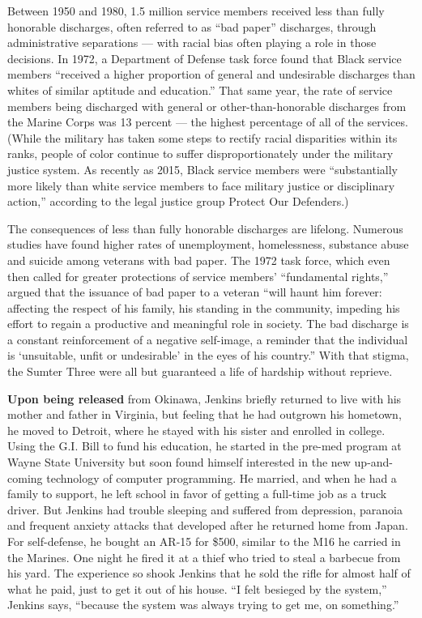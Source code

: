 Between 1950 and 1980, 1.5 million service members received less than
fully honorable discharges, often referred to as ``bad paper''
discharges, through administrative separations --- with racial bias
often playing a role in those decisions. In 1972, a Department of
Defense task force found that Black service members ``received a higher
proportion of general and undesirable discharges than whites of similar
aptitude and education.'' That same year, the rate of service members
being discharged with general or other-than-honorable discharges from
the Marine Corps was 13 percent --- the highest percentage of all of the
services. (While the military has taken some steps to rectify racial
disparities within its ranks, people of color continue to suffer
disproportionately under the military justice system. As recently as
2015, Black service members were ``substantially more likely than white
service members to face military justice or disciplinary action,''
according to the legal justice group Protect Our Defenders.)

The consequences of less than fully honorable discharges are lifelong.
Numerous studies have found higher rates of unemployment, homelessness,
substance abuse and suicide among veterans with bad paper. The 1972 task
force, which even then called for greater protections of service
members' ``fundamental rights,'' argued that the issuance of bad paper
to a veteran ``will haunt him forever: affecting the respect of his
family, his standing in the community, impeding his effort to regain a
productive and meaningful role in society. The bad discharge is a
constant reinforcement of a negative self-image, a reminder that the
individual is `unsuitable, unfit or undesirable' in the eyes of his
country.'' With that stigma, the Sumter Three were all but guaranteed a
life of hardship without reprieve.

\textbf{Upon being released} from Okinawa, Jenkins briefly returned to
live with his mother and father in Virginia, but feeling that he had
outgrown his hometown, he moved to Detroit, where he stayed with his
sister and enrolled in college. Using the G.I. Bill to fund his
education, he started in the pre-med program at Wayne State University
but soon found himself interested in the new up-and-coming technology of
computer programming. He married, and when he had a family to support,
he left school in favor of getting a full-time job as a truck driver.
But Jenkins had trouble sleeping and suffered from depression, paranoia
and frequent anxiety attacks that developed after he returned home from
Japan. For self-defense, he bought an AR-15 for \$500, similar to the
M16 he carried in the Marines. One night he fired it at a thief who
tried to steal a barbecue from his yard. The experience so shook Jenkins
that he sold the rifle for almost half of what he paid, just to get it
out of his house. ``I felt besieged by the system,'' Jenkins says,
``because the system was always trying to get me, on something.''

